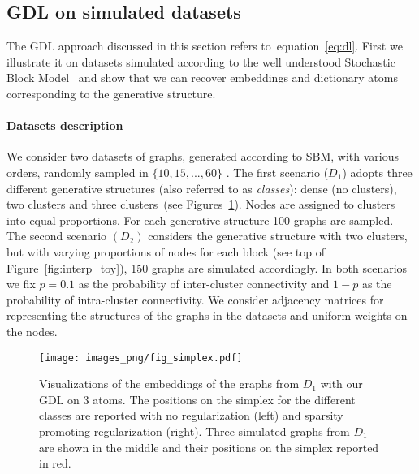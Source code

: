 \documentclass{article}
\def\eqref#1{equation~\ref{#1}}
\begin{document}
	\subsection{GDL on simulated datasets}\label{subsec:simu}
	The GDL approach discussed in this section refers to~\eqref{eq:dl}.
	First we illustrate it on datasets simulated according to the well understood Stochastic Block Model~\citep[SBM,][]{holland1983stochastic,wang1987stochastic} and show that we can recover embeddings and dictionary atoms corresponding to the generative structure.
	
	\paragraph{Datasets description}
	We consider two datasets of graphs, generated according to SBM, with various orders, randomly sampled in $\{10,15,...,60\}$ .
	The first scenario ($D_1$) adopts three different generative structures (also
	referred to as \emph{classes}): dense (no clusters), two clusters and three
	clusters~(see Figures~\ref{fig:simplex}). Nodes are assigned to
	clusters into equal proportions. For each generative structure 100 graphs are
	sampled.
	The second scenario $(D_2)$ considers the generative structure with two clusters,
	but with varying proportions of nodes for each block (see top of
	Figure~\ref{fig:interp_toy}), 150 graphs are simulated
	accordingly.
	In both scenarios we fix $p=0.1$ as the probability of inter-cluster connectivity and $1-p$ as the probability of intra-cluster connectivity. We consider adjacency matrices for representing the structures of the graphs in the datasets and uniform weights on the nodes.
	
	\begin{figure}[t]
		\centering
		\texttt{[image: images\_png/fig\_simplex.pdf]}\vspace{-4mm}
		\caption{Visualizations of the embeddings of the graphs from $D_1$ with our GDL on 3 atoms. The positions on
			the simplex for the different classes are reported with no regularization
			(left) and sparsity promoting regularization (right). Three simulated graphs from $D_1$ are shown in the middle and their positions
			on the simplex reported in red.} \label{fig:simplex}
		\vspace{-5mm}
	\end{figure}
	
\end{document}
